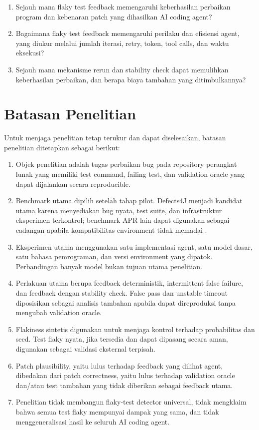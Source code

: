 \begin{enumerate}[leftmargin=*]
    \item Sejauh mana flaky test feedback memengaruhi keberhasilan perbaikan program dan kebenaran patch yang dihasilkan AI coding agent?
    \item Bagaimana flaky test feedback memengaruhi perilaku dan efisiensi agent, yang diukur melalui jumlah iterasi, retry, token, tool calls, dan waktu eksekusi?
    \item Sejauh mana mekanisme rerun dan stability check dapat memulihkan keberhasilan perbaikan, dan berapa biaya tambahan yang ditimbulkannya?
\end{enumerate}

\section{Batasan Penelitian}

Untuk menjaga penelitian tetap terukur dan dapat diselesaikan, batasan penelitian ditetapkan sebagai berikut:

\begin{enumerate}[leftmargin=*]
    \item Objek penelitian adalah tugas perbaikan bug pada repository perangkat lunak yang memiliki test command, failing test, dan validation oracle yang dapat dijalankan secara reproducible.
    \item Benchmark utama dipilih setelah tahap pilot. Defects4J menjadi kandidat utama karena menyediakan bug nyata, test suite, dan infrastruktur eksperimen terkontrol; benchmark APR lain dapat digunakan sebagai cadangan apabila kompatibilitas environment tidak memadai \cite{defects4j2014}.
    \item Eksperimen utama menggunakan satu implementasi agent, satu model dasar, satu bahasa pemrograman, dan versi environment yang dipatok. Perbandingan banyak model bukan tujuan utama penelitian.
    \item Perlakuan utama berupa feedback deterministik, intermittent false failure, dan feedback dengan stability check. False pass dan unstable timeout diposisikan sebagai analisis tambahan apabila dapat direproduksi tanpa mengubah validation oracle.
    \item Flakiness sintetis digunakan untuk menjaga kontrol terhadap probabilitas dan seed. Test flaky nyata, jika tersedia dan dapat dipasang secara aman, digunakan sebagai validasi eksternal terpisah.
    \item Patch plausibility, yaitu lulus terhadap feedback yang dilihat agent, dibedakan dari patch correctness, yaitu lulus terhadap validation oracle dan/atau test tambahan yang tidak diberikan sebagai feedback utama.
    \item Penelitian tidak membangun flaky-test detector universal, tidak mengklaim bahwa semua test flaky mempunyai dampak yang sama, dan tidak menggeneralisasi hasil ke seluruh AI coding agent.
\end{enumerate}

